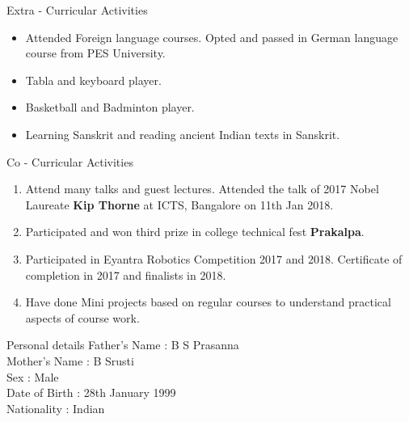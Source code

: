 \documentclass{resume} %
\begin{document}
\begin{rSection}{Extra - Curricular Activities}
\begin{itemize}
    \item Attended Foreign language courses. Opted and passed in German language course from PES University.
    \item Tabla and keyboard player.
    \item Basketball and Badminton player.
    \item Learning Sanskrit and reading ancient Indian texts in Sanskrit.
\end{itemize}
\end{rSection}

\vskip 0.5in


\begin{rSection}{Co - Curricular Activities}
\begin{enumerate}
    \item Attend many talks and guest lectures. Attended the talk of 2017 Nobel Laureate {\bf Kip Thorne} at ICTS, Bangalore on 11th Jan 2018.
    \item Participated and won third prize in college technical fest {\bf Prakalpa}.
    \item Participated in Eyantra Robotics Competition 2017 and 2018. Certificate of completion in 2017 and finalists in 2018. 
    \item Have done Mini projects based on regular courses to understand practical aspects of course work.
\end{enumerate}
\end{rSection}

\pagebreak

\begin{rSection}{Personal details}
Father's Name : B S Prasanna \\
Mother's Name : B Srusti \\
Sex : Male \\
Date of Birth : 28th January 1999 \\
Nationality : Indian \\
\end{rSection}
\end{document}
